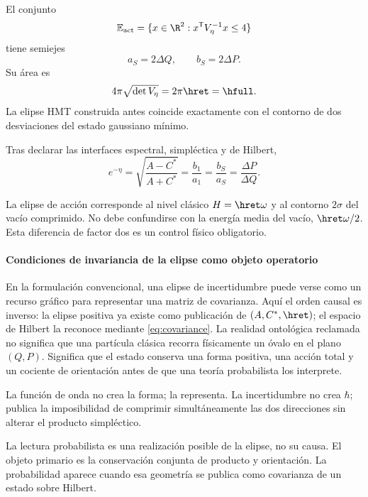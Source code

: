El conjunto
\begin{equation}
\mathbb E_{\mathrm{act}}
=\{x\in\R^2:x^{\mathsf T}V_\eta^{-1}x\le4\}
\label{eq:mahalanobis}
\end{equation}
tiene semiejes
\begin{equation}
a_S=2\Delta Q,\qquad b_S=2\Delta P.
\label{eq:two-sigma}
\end{equation}
Su área es
\[
4\pi\sqrt{\det V_\eta}=2\pi\hret=\hfull.
\]
La elipse HMT construida antes coincide exactamente con el contorno de dos
desviaciones del estado gaussiano mínimo.

\begin{proposition}
Tras declarar las interfaces espectral, simpléctica y de Hilbert,
\begin{equation}
\boxed{
e^{-\eta}
=\sqrt{\frac{A-C^*}{A+C^*}}
=\frac{b_1}{a_1}
=\frac{b_S}{a_S}
=\frac{\Delta P}{\Delta Q}.}
\label{eq:shape-chain-hilbert}
\end{equation}
\end{proposition}

La elipse de acción corresponde al nivel clásico \(H=\hret\omega\) y al
contorno \(2\sigma\) del vacío comprimido. No debe confundirse con la energía
media del vacío, \(\hret\omega/2\). Esta diferencia de factor dos es un
control físico obligatorio.

\paragraph{Condiciones de invariancia de la elipse como objeto operatorio}

En la formulación convencional, una elipse de incertidumbre puede verse como
un recurso gráfico para representar una matriz de covarianza. Aquí el orden
causal es inverso: la elipse positiva ya existe como publicación de
\((A,C^*,\hret)\); el espacio de Hilbert la reconoce mediante
\eqref{eq:covariance}. La realidad ontológica reclamada no significa que una
partícula clásica recorra físicamente un óvalo en el plano \((Q,P)\). Significa
que el estado conserva una forma positiva, una acción total y un cociente de
orientación antes de que una teoría probabilista los interprete.

La función de onda no crea la forma; la representa. La incertidumbre no crea
\(\hbar\); publica la imposibilidad de comprimir simultáneamente las dos
direcciones sin alterar el producto simpléctico.

\begin{narrativebox}
La lectura probabilista es una realización posible de la elipse, no su causa.
El objeto primario es la conservación conjunta de producto y orientación. La
probabilidad aparece cuando esa geometría se publica como covarianza de un
estado sobre Hilbert.
\end{narrativebox}

